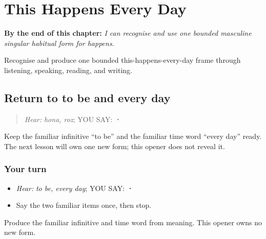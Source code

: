 
\chapter{This Happens Every Day}
\label{ch:pa-a2-hunda}

\begin{chapteropening}
\textbf{By the end of this chapter:} \emph{I can recognise and use one bounded masculine singular habitual form for happens.}

Recognise and produce one bounded this-happens-every-day frame through listening, speaking, reading, and writing.
\end{chapteropening}

\section[\texorpdfstring{\pa{ਹੋਣਾ} · \pa{ਰੋਜ਼} (hona · roz)}{ਹੋਣਾ · ਰੋਜ਼ (hona · roz)}]{Return to to be and every day}

\label{lesson:PA-C207-hona-return}



\begin{quote}
\emph{Hear:} \emph{hona, roz}; YOU SAY: \textbf{ · }
\end{quote}

\begin{grammarlens}[title={Grammar Lens}]
Keep the familiar infinitive “to be” and the familiar time word “every day” ready. The next lesson will own one new form; this opener does not reveal it.
\end{grammarlens}

\subsection*{Your turn}
\begin{itemize}
\raggedright
  \item \emph{Hear:} \emph{to be, every day}; YOU SAY: \textbf{ · }
  \item Say the two familiar items once, then stop.
\end{itemize}

\begin{tcolorbox}[breakable,colback=teal!4,colframe=teal!35!black,title={Before you move on}]
Produce the familiar infinitive and time word from meaning. This opener owns no new form.
\end{tcolorbox}
